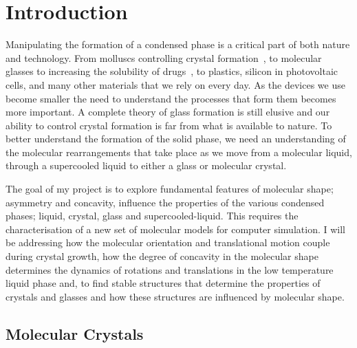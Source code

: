 
\chapter{Introduction}



Manipulating the formation of a condensed phase is a critical part of both nature and technology. From molluscs controlling crystal formation~\cite{de-yoreo:03}, to molecular glasses to increasing the solubility of drugs~\cite{hancock:00}, to plastics\tocite, silicon in photovoltaic cells\tocite, and many other materials that we rely on every day. As the devices we use become smaller the need to understand the processes that form them becomes more important. A complete theory of glass formation is still elusive and our ability to control crystal formation is far from what is available to nature. To better understand the formation of the solid phase, we need an understanding of the molecular rearrangements that take place as we move from a molecular liquid, through a supercooled liquid to either a glass or molecular crystal.

The goal of my project is to explore fundamental features of molecular shape; asymmetry and concavity, influence the properties of the various condensed phases; liquid, crystal, glass and supercooled-liquid. This requires the characterisation of a new set of molecular models for computer simulation. I will be addressing how the molecular orientation and translational motion couple during crystal growth, how the degree of concavity in the molecular shape determines the dynamics of rotations and translations in the low temperature liquid phase and, to find stable structures that determine the properties of crystals and glasses and how these structures are influenced by molecular shape.


\section{Molecular Crystals}

